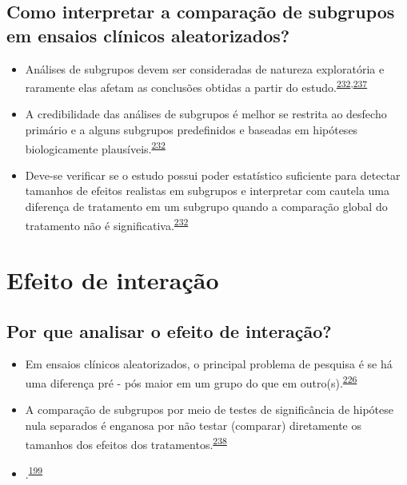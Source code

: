 \documentclass[
  a4paper,
]{book}
\providecommand{\tightlist}{%
  \setlength{\itemsep}{0pt}\setlength{\parskip}{0pt}}
\begin{document}
\hypertarget{como-interpretar-a-comparauxe7uxe3o-de-subgrupos-em-ensaios-cluxednicos-aleatorizados}{%
\subsection{Como interpretar a comparação de subgrupos em ensaios clínicos aleatorizados?}\label{como-interpretar-a-comparauxe7uxe3o-de-subgrupos-em-ensaios-cluxednicos-aleatorizados}}

\begin{itemize}
\tightlist
\item
  Análises de subgrupos devem ser consideradas de natureza exploratória e raramente elas afetam as conclusões obtidas a partir do estudo.\textsuperscript{\protect\hyperlink{ref-Assmann2000}{232},\protect\hyperlink{ref-Brookes2004}{237}}
\end{itemize}

\begin{itemize}
\item
  A credibilidade das análises de subgrupos é melhor se restrita ao desfecho primário e a alguns subgrupos predefinidos e baseadas em hipóteses biologicamente plausíveis.\textsuperscript{\protect\hyperlink{ref-Assmann2000}{232}}
\item
  Deve-se verificar se o estudo possui poder estatístico suficiente para detectar tamanhos de efeitos realistas em subgrupos e interpretar com cautela uma diferença de tratamento em um subgrupo quando a comparação global do tratamento não é significativa.\textsuperscript{\protect\hyperlink{ref-Assmann2000}{232}}
\end{itemize}

\hypertarget{interacao}{%
\section{Efeito de interação}\label{interacao}}

\hypertarget{por-que-analisar-o-efeito-de-interauxe7uxe3o}{%
\subsection{Por que analisar o efeito de interação?}\label{por-que-analisar-o-efeito-de-interauxe7uxe3o}}

\begin{itemize}
\item
  Em ensaios clínicos aleatorizados, o principal problema de pesquisa é se há uma diferença pré - pós maior em um grupo do que em outro(s).\textsuperscript{\protect\hyperlink{ref-bland2011}{226}}
\item
  A comparação de subgrupos por meio de testes de significância de hipótese nula separados é enganosa por não testar (comparar) diretamente os tamanhos dos efeitos dos tratamentos.\textsuperscript{\protect\hyperlink{ref-Matthews1996}{238}}
\item
  .\textsuperscript{\protect\hyperlink{ref-Bours2023}{199}}
\end{itemize}
\end{document}
